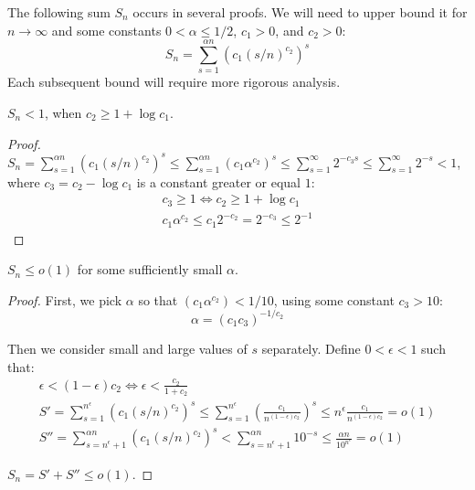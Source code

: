The following sum $S_n$ occurs in several proofs. We will need to upper bound it
for $n\to\infty$ and some constants $0<\alpha\leq 1/2$, $c_1>0$, and $c_2>0$:
\begin{equation}
    S_n=\sum_{s=1}^{\alpha n}{\left(c_1(s/n)^{c_2}\right)^s}
\end{equation}
Each subsequent bound will require more rigorous analysis.

\begin{proposition}
    $S_n<1$, when $c_2\geq1+\log c_1$.
\end{proposition}

\begin{proof}
    $S_n=\sum_{s=1}^{\alpha n}{\left(c_1(s/n)^{c_2}\right)^s}
    \leq\sum_{s=1}^{\alpha n}{\left(c_1\alpha^{c_2}\right)^s}
    \leq\sum_{s=1}^{\infty}{2^{-c_3s}}
    \leq\sum_{s=1}^{\infty}{2^{-s}}<1$,
    where $c_3=c_2-\log c_1$ is a constant greater or equal $1$:
    \begin{gather}
        c_3\geq 1\iff c_2\geq 1+\log c_1\\
        c_1\alpha^{c_2}\leq c_1 2^{-c_2}=2^{-c_3}\leq 2^{-1}
    \end{gather}
\end{proof}

\begin{proposition}
    \label{pro:bound-prob-small-sets}
    $S_n\leq o(1)$ for some sufficiently small $\alpha$.
\end{proposition}

\begin{proof}
    First, we pick $\alpha$ so that $\left(c_1\alpha^{c_2}\right)<1/10$,
    using some constant $c_3>10$:
    \begin{equation}
        \alpha=(c_1c_3)^{-1/c_2}
    \end{equation}
    
    Then we consider small and large values of $s$ separately.
    Define $0<\epsilon<1$ such that:
    \begin{gather}
        \epsilon<(1-\epsilon)c_2\iff\epsilon<\frac{c_2}{1+c_2}\\
        S'=\sum_{s=1}^{n^\epsilon}{\left(c_1(s/n)^{c_2}\right)^s}
        \leq\sum_{s=1}^{n^\epsilon}{\left(\frac{c_1}{n^{(1-\epsilon)c_2}}\right)^s}
        \leq n^\epsilon\frac{c_1}{n^{(1-\epsilon)c_2}}=o(1)\\
        S''=\sum_{s=n^\epsilon+1}^{\alpha n}{(c_1(s/n)^{c_2})^s}
        <\sum_{s=n^\epsilon+1}^{\alpha n}{10^{-s}}
        \leq\frac{\alpha n}{10^{n^\epsilon}}=o(1)
    \end{gather}
    
    $S_n=S'+S''\leq o(1)$.
\end{proof}

